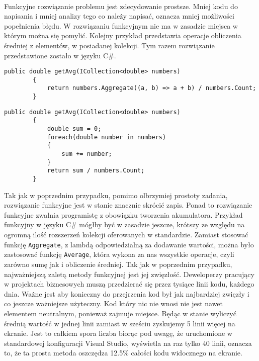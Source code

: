 \documentclass[a4paper,10pt]{report}
\begin{document}
\paragraph{}
Funkcyjne rozwiązanie problemu jest zdecydowanie prostsze. Mniej kodu do napisania i mniej analizy tego co należy napisać, oznacza mniej możliwości popełnienia błędu. W rozwiązaniu funkcyjnym nie ma w zasadzie miejsca w którym można się pomylić. Kolejny przykład przedstawia operacje obliczenia średniej z elementów, w posiadanej kolekcji. Tym razem rozwiązanie przedstawione zostało w języku C\#. 
\begin{lstlisting}[caption={Redukcja. Podejście funkcyjne},label={lst:newReduce},style=sharpc]
        public double getAvg(ICollection<double> numbers)
        {
        	return numbers.Aggregate((a, b) => a + b) / numbers.Count;
        }
\end{lstlisting}
\begin{lstlisting}[caption={Redukcja. Podejście funkcyjne},label={lst:oldReduce},style=sharpc]
        public double getAvg(ICollection<double> numbers)
        {
        	double sum = 0;
        	foreach(double number in numbers)
        	{
        		sum += number;
        	}
        	return sum / numbers.Count;
        }
        \end{lstlisting}
        Tak jak w poprzednim przypadku, pomimo olbrzymiej prostoty zadania, rozwiązanie funkcyjne jest w stanie znacznie skrócić zapis. Ponad to rozwiązanie funkcyjne zwalnia programistę z obowiązku tworzenia akumulatora. Przykład funkcyjny w języku C\# mógłby być w zasadzie jeszcze, krótszy ze względu na ogromną ilość rozszerzeń kolekcji oferowanych w standardzie. Zamiast stosować funkcję \verb|Aggregate|, z lambdą odpowiedzialną za dodawanie wartości, można było zastosować funkcję \verb|Average|, która wykona za nas wszystkie operacje, czyli zarówno sumę jak i obliczenie średniej. Tak jak w poprzednim przypadku, najważniejszą zaletą metody funkcyjnej jest jej zwięzłość. Deweloperzy pracujący w projektach biznesowych muszą przedzierać się przez tysiące linii kodu, każdego dnia. Ważne jest aby konieczny do przejrzenia kod był jak najbardziej zwięzły i co jeszcze ważniejsze użyteczny. Kod który nic nie wnosi nie jest nawet elementem neutralnym, ponieważ zajmuje miejsce. Będąc w stanie wyliczyć średnią wartość w jednej linii zamiast w sześciu zyskujemy 5 linii więcej na ekranie. Jest to całkiem spora liczba biorąc pod uwagę, że uruchomione w standardowej konfiguracji Visual Studio, wyświetla na raz tylko 40 linii, oznacza to, że ta prosta metoda oszczędza 12.5\% całości kodu widocznego na ekranie.
\end{document}
